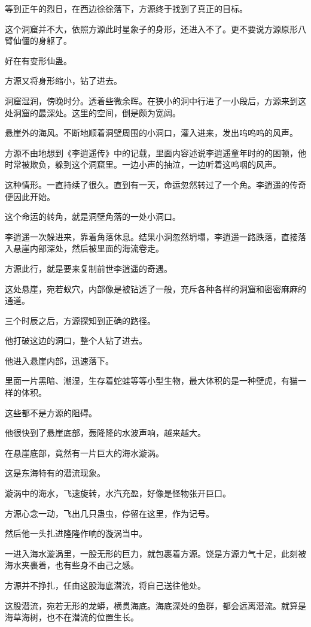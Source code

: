 \begin{this_body}
等到正午的烈日，在西边徐徐落下，方源终于找到了真正的目标。

这个洞窟并不大，依照方源此时星象子的身形，还进入不了。更不要说方源原形八臂仙僵的身躯了。

好在有变形仙蛊。

方源又将身形缩小，钻了进去。

洞窟湿润，傍晚时分。透着些微余晖。在狭小的洞中行进了一小段后，方源来到这处洞窟的最深处。这里的空间，倒是颇为宽阔。

悬崖外的海风。不断地顺着洞壁周围的小洞口，灌入进来，发出呜呜呜的风声。

方源不由地想到《李逍遥传》中的记载，里面内容述说李逍遥童年时的的困顿，他时常被欺负，躲到这个洞窟里。一边小声的抽泣，一边听着这呜咽的风声。

这种情形。一直持续了很久。直到有一天，命运忽然转过了一个角。李逍遥的传奇便因此开始。

这个命运的转角，就是洞壁角落的一处小洞口。

李逍遥一次躲进来，靠着角落休息。结果小洞忽然坍塌，李逍遥一路跌落，直接落入悬崖内部深处，然后被里面的海流卷走。

方源此行，就是要来复制前世李逍遥的奇遇。

这处悬崖，宛若蚁穴，内部像是被钻透了一般，充斥各种各样的洞窟和密密麻麻的通道。

三个时辰之后，方源探知到正确的路径。

他打破这边的洞口，整个人钻了进去。

他进入悬崖内部，迅速落下。

里面一片黑暗、潮湿，生存着蛇蛙等等小型生物，最大体积的是一种壁虎，有猫一样的体积。

这些都不是方源的阻碍。

他很快到了悬崖底部，轰隆隆的水波声响，越来越大。

在悬崖底部，竟然有一片巨大的海水漩涡。

这是东海特有的潜流现象。

漩涡中的海水，飞速旋转，水汽充盈，好像是怪物张开巨口。

方源心念一动，飞出几只蛊虫，停留在这里，作为记号。

然后他一头扎进隆隆作响的漩涡当中。

一进入海水漩涡里，一股无形的巨力，就包裹着方源。饶是方源力气十足，此刻被海水夹裹着，也有些身不由己之感。

方源并不挣扎，任由这股海底潜流，将自己送往他处。

这股潜流，宛若无形的龙蟒，横贯海底。海底深处的鱼群，都会远离潜流。就算是海草海树，也不在潜流的位置生长。


\end{this_body}

